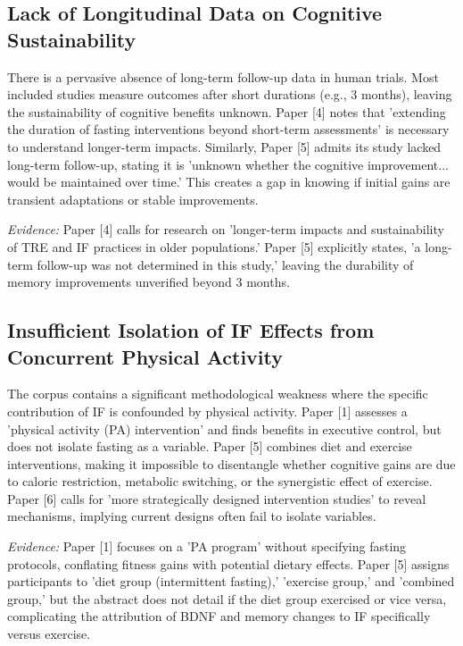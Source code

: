 \documentclass[11pt]{article}
\begin{document}
\subsection{Lack of Longitudinal Data on Cognitive Sustainability}
There is a pervasive absence of long-term follow-up data in human trials. Most included studies measure outcomes after short durations (e.g., 3 months), leaving the sustainability of cognitive benefits unknown. Paper [4] notes that 'extending the duration of fasting interventions beyond short-term assessments' is necessary to understand longer-term impacts. Similarly, Paper [5] admits its study lacked long-term follow-up, stating it is 'unknown whether the cognitive improvement... would be maintained over time.' This creates a gap in knowing if initial gains are transient adaptations or stable improvements.

\textit{Evidence:} Paper [4] calls for research on 'longer-term impacts and sustainability of TRE and IF practices in older populations.' Paper [5] explicitly states, 'a long-term follow-up was not determined in this study,' leaving the durability of memory improvements unverified beyond 3 months.

\subsection{Insufficient Isolation of IF Effects from Concurrent Physical Activity}
The corpus contains a significant methodological weakness where the specific contribution of IF is confounded by physical activity. Paper [1] assesses a 'physical activity (PA) intervention' and finds benefits in executive control, but does not isolate fasting as a variable. Paper [5] combines diet and exercise interventions, making it impossible to disentangle whether cognitive gains are due to caloric restriction, metabolic switching, or the synergistic effect of exercise. Paper [6] calls for 'more strategically designed intervention studies' to reveal mechanisms, implying current designs often fail to isolate variables.

\textit{Evidence:} Paper [1] focuses on a 'PA program' without specifying fasting protocols, conflating fitness gains with potential dietary effects. Paper [5] assigns participants to 'diet group (intermittent fasting),' 'exercise group,' and 'combined group,' but the abstract does not detail if the diet group exercised or vice versa, complicating the attribution of BDNF and memory changes to IF specifically versus exercise.
\end{document}
